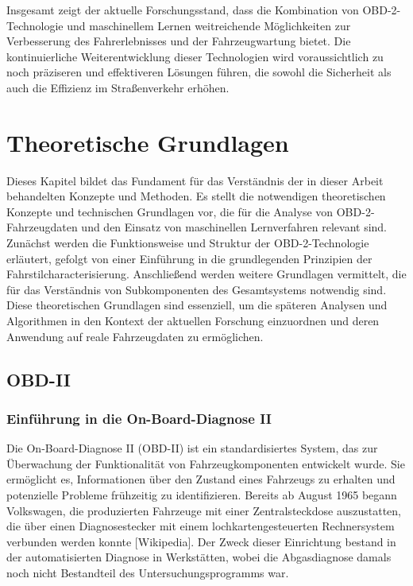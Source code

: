 \documentclass[oneside]{ausarbeitung}
\begin{document}
Insgesamt zeigt der aktuelle Forschungsstand, dass die Kombination von OBD-2-Technologie und maschinellem Lernen weitreichende Möglichkeiten zur Verbesserung des Fahrerlebnisses und der Fahrzeugwartung bietet. Die kontinuierliche Weiterentwicklung dieser Technologien wird voraussichtlich zu noch präziseren und effektiveren Lösungen führen, die sowohl die Sicherheit als auch die Effizienz im Straßenverkehr erhöhen.


\chapter{Theoretische Grundlagen}
\label{cha:grundlagen}

Dieses Kapitel bildet das Fundament für das Verständnis der in dieser Arbeit behandelten Konzepte und Methoden. Es stellt die notwendigen theoretischen Konzepte und technischen Grundlagen vor, die für die Analyse von OBD-2-Fahrzeugdaten und den Einsatz von maschinellen Lernverfahren relevant sind. Zunächst werden die Funktionsweise und Struktur der OBD-2-Technologie erläutert, gefolgt von einer Einführung in die grundlegenden Prinzipien der Fahrstilcharacterisierung. Anschließend werden weitere Grundlagen vermittelt, die für das Verständnis von Subkomponenten des Gesamtsystems notwendig sind. Diese theoretischen Grundlagen sind essenziell, um die späteren Analysen und Algorithmen in den Kontext der aktuellen Forschung einzuordnen und deren Anwendung auf reale Fahrzeugdaten zu ermöglichen.

\section{OBD-II}
\label{sec:foundations_obd2}

\subsection*{Einführung in die On-Board-Diagnose II}
\label{subsec:foundations_obd2_intro}
Die On-Board-Diagnose II (OBD-II) ist ein standardisiertes System, das zur Überwachung der Funktionalität von Fahrzeugkomponenten entwickelt wurde. Sie ermöglicht es, Informationen über den Zustand eines Fahrzeugs zu erhalten und potenzielle Probleme frühzeitig zu identifizieren. Bereits ab August 1965 begann Volkswagen, die produzierten Fahrzeuge mit einer Zentralsteckdose auszustatten, die über einen Diagnosestecker mit einem lochkartengesteuerten Rechnersystem verbunden werden konnte [Wikipedia]. Der Zweck dieser Einrichtung bestand in der automatisierten Diagnose in Werkstätten, wobei die Abgasdiagnose damals noch nicht Bestandteil des Untersuchungsprogramms war.
\end{document}
